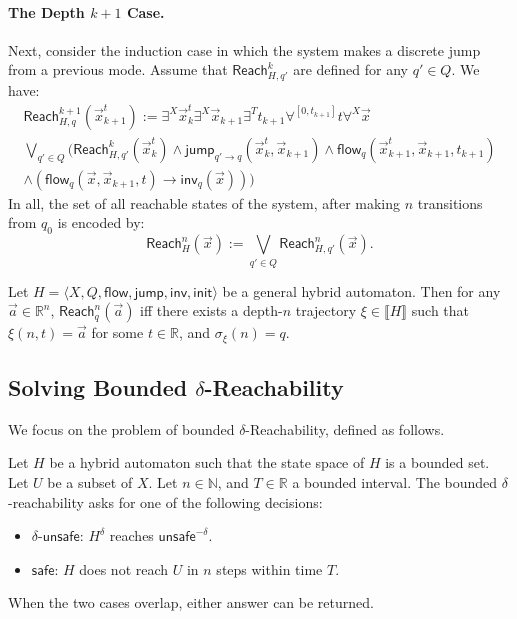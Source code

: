 \documentclass[envcountsect]{llncs}
\newcommand{\flow}{\mathsf{flow}}
\newcommand{\jump}{\mathsf{jump}}
\newcommand{\inv}{\mathsf{inv}}
\newcommand{\init}{\mathsf{init}}
\newcommand{\reach}{\mathsf{Reach}}
\newcommand{\unsafe}{\mathsf{unsafe}}
\newcommand{\safe}{\mathsf{safe}}
\begin{document}
\paragraph{The Depth $k+1$ Case.} Next, consider the induction case in
which
the system makes a discrete jump from a previous mode. Assume that
$\reach^k_{H,q'}$ are defined for any $q'\in Q$. We have:
\begin{multline*}
\reach^{k+1}_{H,q}(\vec x_{k+1}^t):=  \exists^X \vec x_k^t \exists^X \vec
x_{k+1}\exists^{T} t_{k+1}\forall^{[0,t_{k+1}]}t\forall^X \vec x \\
\bigvee_{q'\in Q} (\reach^k_{H,q'} (\vec x_k^t) \wedge \jump_{q'\rightarrow
q}(\vec x_k^t, \vec x_{k+1}) \wedge \flow_{q}(\vec x_{k+1}^t, \vec x_{k+1},
t_{k+1})\\
\wedge(\flow_q(\vec x, \vec x_{k+1}, t)\rightarrow \inv_q(\vec x)))
\end{multline*}
In all, the set of all reachable states of the system, after making $n$
transitions from $q_0$ is encoded by:
$$\reach^n_{H}(\vec x) := \bigvee_{q'\in Q} \reach^n_{H,q'}(\vec x).$$

\begin{proposition}\label{with-inv}
Let $H = \langle X, Q, \flow, \jump, \inv, \init \rangle$ be a general hybrid
automaton. Then for any $\vec a\in \mathbb{R}^n$, $\reach^n_q(\vec a)$ iff there
exists a depth-$n$ trajectory $\xi\in\llbracket H\rrbracket$ such that $\xi(n,
t) = \vec a$ for some $t\in\mathbb{R}$, and $\sigma_{\xi}(n) = q$.
\end{proposition}

\subsection{Solving Bounded $\delta$-Reachability}

We focus on the problem of bounded $\delta$-Reachability, defined as follows.

\begin{definition}
Let $H$ be a hybrid automaton such that the state space of $H$ is a bounded set. Let $U$ be a subset of $X$. Let $n\in \mathbb{N}$, and $T\in \mathbb{R}$ a bounded interval. The bounded $\delta$-reachability asks for one of the following decisions:
\begin{itemize}
\item $\delta$-$\unsafe$: $H^{\delta}$ reaches $\unsafe^{-\delta}$.
\item $\safe$: $H$ does not reach $U$ in $n$ steps within time $T$.
\end{itemize}
When the two cases overlap, either answer can be returned.
\end{definition}
\end{document}
